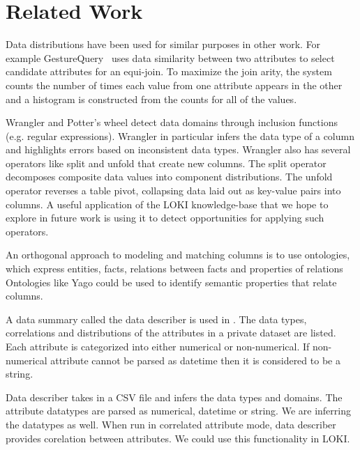 \documentclass{vldb}
\begin{document}
\section{Related Work}
Data distributions have been used for similar purposes in other work.  
For example GestureQuery~\cite{nandi2013gestural} uses data similarity between two attributes to select candidate attributes for an equi-join.  
To maximize the join arity, the system counts the number of times each value from one attribute appears in the other and a histogram is constructed from the counts for all of the values.

Wrangler \cite{kandel2011wrangler} and Potter's wheel \cite{raman2001potter} detect data domains through inclusion functions (e.g. regular expressions).
Wrangler in particular infers the data type of a column and highlights errors based on inconsistent data types. 
Wrangler also has several operators like split and unfold that create new columns.
The split operator decomposes composite data values into component distributions.  
The unfold operator reverses a table pivot, collapsing data laid out as key-value pairs into columns.  
A useful application of the LOKI knowledge-base that we hope to explore in future work is using it to detect opportunities for applying such operators.

An orthogonal approach to modeling and matching columns is to use ontologies, which express entities, facts, relations between facts and properties of relations
Ontologies like Yago \cite{fabian2007yago} could be used to identify semantic properties that relate columns.

A data summary called the data describer is used in \cite{ping2017datasynthesizer}. The data types, correlations and distributions of the attributes in a private dataset are listed. Each attribute is categorized into either numerical or non-numerical. If non-numerical attribute cannot be parsed as datetime then it is considered to be a string.

Data describer takes in a CSV file and infers the data types and domains. The attribute datatypes are parsed as numerical, datetime or string. We are inferring the datatypes as well. When run in correlated attribute mode, data describer provides corelation between attributes. We could use this functionality in LOKI.
\end{document}
